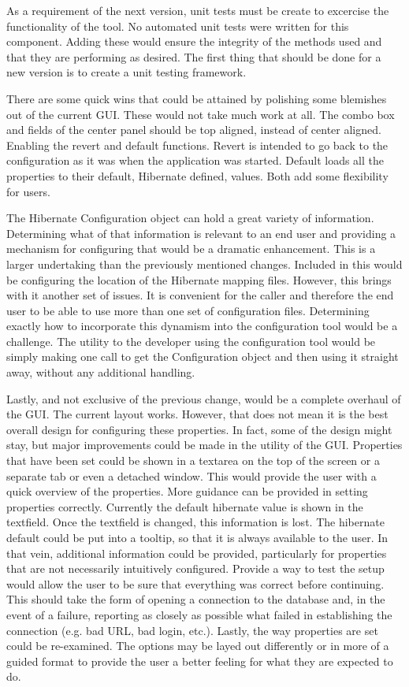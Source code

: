As a requirement of the next version, unit tests must be create to excercise the functionality of the tool. No automated unit tests were written for this component. Adding these would ensure the integrity of the methods used and that they are performing as desired. The first thing that should be done for a new version is to create a unit testing framework. 

There are some quick wins that could be attained by polishing some blemishes out of the current GUI. These would not take much work at all. The combo box and fields of the center panel should be top aligned, instead of center aligned. Enabling the revert and default functions. Revert is intended to go back to the configuration as it was when the application was started. Default loads all the properties to their default, Hibernate defined, values. Both add some flexibility for users.

The Hibernate Configuration object can hold a great variety of information. Determining what of that information is relevant to an end user and providing a mechanism for configuring that would be a dramatic enhancement. This is a larger undertaking than the previously mentioned changes. Included in this would be configuring the location of the Hibernate mapping files. However, this brings with it another set of issues. It is convenient for the caller and therefore the end user to be able to use more than one set of configuration files. Determining exactly how to incorporate this dynamism into the configuration tool would be a challenge. The utility to the developer using the configuration tool would be simply making one call to get the Configuration object and then using it straight away, without any additional handling.

Lastly, and not exclusive of the previous change, would be a complete overhaul of the GUI. The current layout works. However, that does not mean it is the best overall design for configuring these properties. In fact, some of the design might stay, but major improvements could be made in the utility of the GUI. Properties that have been set could be shown in a textarea on the top of the screen or a separate tab or even a detached window. This would provide the user with a quick overview of the properties. More guidance can be provided in setting properties correctly. Currently the default hibernate value is shown in the textfield. Once the textfield is changed, this information is lost. The hibernate default could be put into a tooltip, so that it is always available to the user. In that vein, additional information could be provided, particularly for properties that are not necessarily intuitively configured. Provide a way to test the setup would allow the user to be sure that everything was correct before continuing. This should take the form of opening a connection to the database and, in the event of a failure, reporting as closely as possible what failed in establishing the connection (e.g. bad URL, bad login, etc.). Lastly, the way properties are set could be re-examined. The options may be layed out differently or in more of a guided format to provide the user a better feeling for what they are expected to do.



